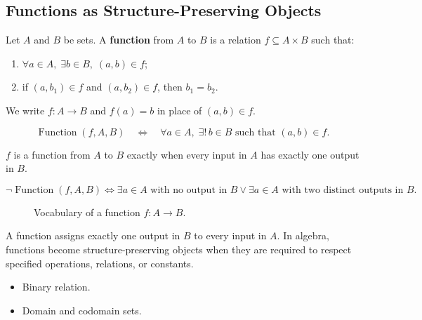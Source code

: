 \subsection{Functions as Structure-Preserving Objects}
\label{subsec:functions-as-structure-preserving-objects}

\begin{tcolorbox}[title={Definition --- Function}]
\begin{definition}[Function]
\label{def:alg-function}
Let $A$ and $B$ be sets.
A \textbf{function} from $A$ to $B$ is a relation $f \subseteq A \times B$
such that:
\begin{enumerate}[label=(\roman*)]
  \item $\forall a \in A,\; \exists b \in B,\; (a,b) \in f$;
  \item if $(a,b_1) \in f$ and $(a,b_2) \in f$, then $b_1=b_2$.
\end{enumerate}
We write $f:A\to B$ and $f(a)=b$ in place of $(a,b)\in f$.
\end{definition}
\end{tcolorbox}

\begin{remark*}
\[
\operatorname{Function}(f,A,B)
\quad\Longleftrightarrow\quad
\forall a \in A,\; \exists!\, b \in B \text{ such that } (a,b)\in f.
\]
\end{remark*}

\begin{remark*}
$f$ is a function from $A$ to $B$ exactly when every input in $A$ has exactly
one output in $B$.
\end{remark*}

\begin{remark*}
\[
\neg\operatorname{Function}(f,A,B)
\Longleftrightarrow
\exists a\in A\text{ with no output in }B
\lor
\exists a\in A\text{ with two distinct outputs in }B.
\]
\end{remark*}

\begin{figure}[htbp]
  \centering
  
  \caption{Vocabulary of a function $f:A\to B$.}
  \label{fig:function-vocabulary}
\end{figure}

\begin{remark*}[Interpretation]
A function assigns exactly one output in $B$ to every input in $A$.
In algebra, functions become structure-preserving objects when they are
required to respect specified operations, relations, or constants.
\end{remark*}

\begin{remark*}[Dependencies]
\begin{itemize}
  \item Binary relation.
  \item Domain and codomain sets.
\end{itemize}
\end{remark*}
